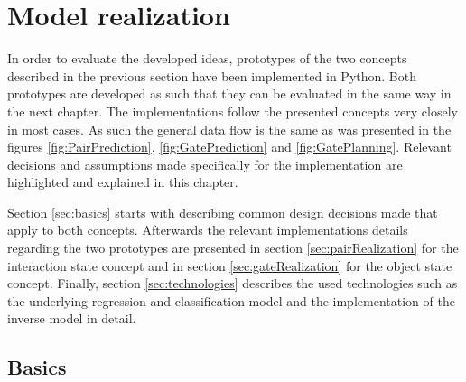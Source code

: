 \chapter{Model realization\label{chap:modelReal}}




In order to evaluate the developed ideas, prototypes of the two concepts described in the previous section have been implemented in Python. Both prototypes are developed as such that they can be evaluated in the same way in the next chapter. The implementations follow the presented concepts very closely in most cases. As such the general data flow is the same as was presented in the figures  \ref{fig:PairPrediction}, \ref{fig:GatePrediction} and \ref{fig:GatePlanning}.
Relevant decisions and assumptions made specifically for the implementation are highlighted and explained in this chapter. %

Section \ref{sec:basics} starts with describing common design decisions made that apply to both concepts. Afterwards the relevant implementations details regarding the two prototypes are presented in section \ref{sec:pairRealization} for the interaction state concept and in section \ref{sec:gateRealization} for the object state concept. Finally, section \ref{sec:technologies} describes the used technologies such as the underlying regression and classification model and the implementation of the inverse model in detail.

\section{Basics \label{sec:basics}}


